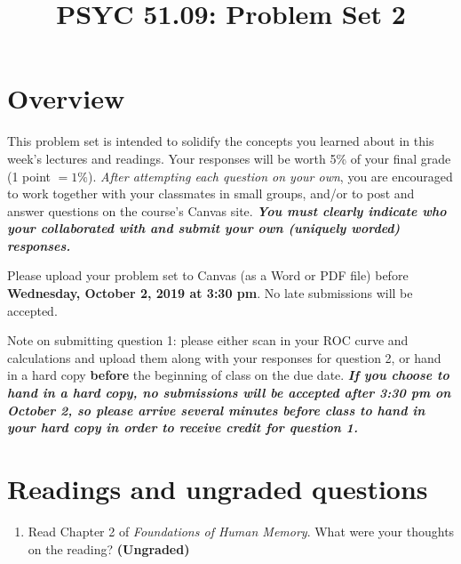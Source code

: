 \documentclass[11pt]{article}
\title{PSYC 51.09: Problem Set 2}
\date{}
\begin{document}
\maketitle
\vspace{-0.75in}
\section*{Overview}
This problem set is intended to solidify the concepts you learned
about in this week's lectures and readings.  Your responses will be
worth 5\% of your final grade (1 point $= 1\%$).  \textit{After
  attempting each question on your own}, you are encouraged to work
together with your classmates in small groups, and/or to post and
answer questions on the course’s Canvas site.  \textbf{\textit{You
    must clearly indicate who your collaborated with and submit your
    own (uniquely worded) responses.}}

Please upload your problem set to Canvas (as a Word or PDF file)
before \textbf{Wednesday, October 2, 2019 at 3:30 pm}.  No late
submissions will be accepted.

Note on submitting question 1: please either scan in your ROC curve
and calculations and upload them along with your responses for
question 2, or hand in a hard copy \textbf{before} the beginning of
class on the due date.  \textbf{\textit{If you choose to hand in a
    hard copy, no submissions will be accepted after 3:30 pm on
    October 2, so please arrive several minutes before class to hand
    in your hard copy in order to receive credit for question 1.}}

\section*{Readings and ungraded questions}
\begin{enumerate}
\item Read Chapter 2 of \textit{Foundations of Human Memory}.  What were your thoughts on the reading?
  \textbf{(Ungraded)}
\end{enumerate}
\end{document}

